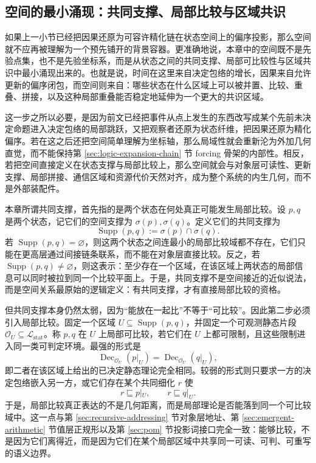 \subsection{空间的最小涌现：共同支撑、局部比较与区域共识}\label{subsec:physical-spacetime-skeleton-space-shared-support}

如果上一小节已经把因果还原为可容许精化链在状态空间上的偏序投影，那么空间就不应再被理解为一个预先铺开的背景容器。更准确地说，本章中的空间既不是先验点集，也不是先验坐标系，而是从状态之间的共同支撑、局部可比较性与区域共识中最小涌现出来的。也就是说，时间在这里来自决定包络的增长，因果来自允许更新的偏序闭包，而空间则来自：哪些状态在什么区域上可以被并置、比较、重叠、拼接，以及这种局部重叠能否稳定地延伸为一个更大的共识区域。

这一步之所以必要，是因为前文已经把事件从点上发生的东西改写成某个先前未决定命题进入决定包络的局部跳跃，又把观察者还原为状态纤维，把因果还原为精化偏序。若在这之后还把空间简单理解为坐标轴，那么局域性就会重新沦为外加几何直觉，而不能保持第 \ref{sec:logic-expansion-chain} 节 forcing 骨架的内部性。相反，若把空间直接定义在状态支撑与局部比较上，那么空间就会与对象层可读性、更新支撑、局部拼接、通信区域和资源代价天然对齐，成为整个系统的内生几何，而不是外部装配件。

本章所谓共同支撑，首先指的是两个状态在何处真正可能发生局部比较。设 \(p,q\) 是两个状态，记它们的空间支撑为 \(\sigma(p),\sigma(q)\)。定义它们的共同支撑为
\[
\operatorname{Supp}(p,q):=\sigma(p)\cap \sigma(q).
\]
若 \(\operatorname{Supp}(p,q)=\varnothing\)，则这两个状态之间连最小的局部比较域都不存在，它们只能在更高层通过间接链条联系，而不能在对象层直接比较。反之，若 \(\operatorname{Supp}(p,q)\neq\varnothing\)，则这表示：至少存在一个区域，在该区域上两状态的局部信息可以同时被拉到同一个比较平面上。于是，共同支撑不是空间接近的近似说法，而是空间关系最原始的逻辑定义：有共同支撑，才有直接局部比较的资格。

但共同支撑本身仍然太弱，因为“能放在一起比”不等于“可比较”。因此第二步必须引入局部比较。固定一个区域 \(U\subseteq \operatorname{Supp}(p,q)\)，并固定一个可观测静态片段 \(\mathcal O_U\subseteq \mathcal L_{\mathrm{stat}}\)。称 \(p,q\) 在 \(U\) 上局部可比较，若它们在 \(U\) 上都可限制，且这些限制进入同一类可判定环境。最强的形式是
\[
\operatorname{Dec}_{\mathcal O_U}(p|_U)=\operatorname{Dec}_{\mathcal O_U}(q|_U),
\]
即二者在该区域上给出的已决定静态理论完全相同。较弱的形式则只要求一方的决定包络嵌入另一方，或它们存在某个共同细化 \(r\) 使
\[
r\sqsubseteq p|_U,\qquad r\sqsubseteq q|_U.
\]
于是，局部比较真正表达的不是几何距离，而是局部理论是否能落到同一个可比较域中。这一点与第 \ref{sec:recursive-addressing} 节对象层地址、第 \ref{sec:emergent-arithmetic} 节值层正规形以及第 \ref{sec:pom} 节投影词接口完全一致：能够比较，不是因为它们离得近，而是因为它们在某个局部区域中共享同一可读、可判、可重写的语义边界。

